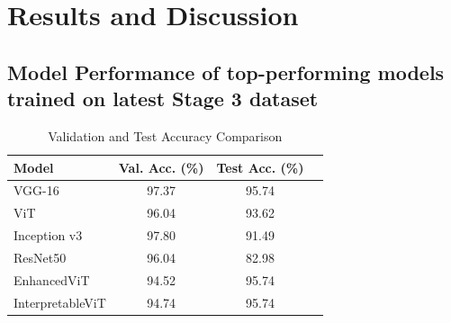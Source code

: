 \documentclass[a4paper,12pt]{report}
\begin{document}
\chapter{Results and Discussion}\label{res:resultsfull}

\section{Model Performance of top-performing models trained on latest Stage 3 dataset}

\begin{table}[H]
    \centering
    \caption{Validation and Test Accuracy Comparison}
    \label{tab:val_test_comparison}
    \begin{tabular}{lccc}
    \toprule
    \textbf{Model} & \textbf{Val. Acc. (\%)} & \textbf{Test Acc. (\%)} \\
    \midrule
    VGG-16  & 97.37 & 95.74 \\
    ViT & 96.04 & 93.62 \\
    Inception v3 & 97.80 & 91.49  \\
    ResNet50 & 96.04 & 82.98 \\
    EnhancedViT & 94.52 & 95.74  \\
    InterpretableViT & 94.74 & 95.74 \\
    \bottomrule
    \end{tabular}
\end{table}

\begin{table}[H]
    \centering
    \caption{Comprehensive Model Performance Metrics on Test Dataset}
    \label{tab:combined_performance}
\end{table}
\end{document}
